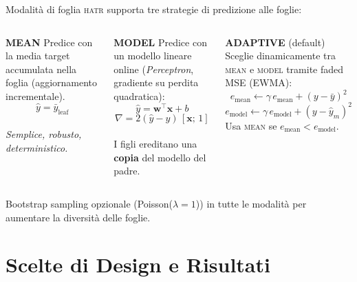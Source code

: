 \documentclass[aspectratio=169,10pt]{beamer}
\newcommand{\hatr}{\textsc{hatr}}
\begin{document}
\begin{frame}{Modalità di foglia}
  \hatr{} supporta tre strategie di predizione alle foglie:

  \bigskip
  \begin{columns}[T]
    \begin{block}{\textbf{MEAN}}
      Predice con la \alert{media target} accumulata nella foglia
      (aggiornamento incrementale).
      \[
        \hat{y} = \bar{y}_{\text{leaf}}
      \]
      \vspace{2pt}\\
      \textit{Semplice, robusto, deterministico.}
    \end{block}

    \begin{block}{\textbf{MODEL}}
      Predice con un \alert{modello lineare online} (\emph{Perceptron},
      gradiente su perdita quadratica):
      \[
        \hat{y} = \mathbf{w}^{\!\top}\!\mathbf{x} + b
      \]
      \[
        \nabla = 2(\hat{y}-y)\,[\mathbf{x};\,1]
      \]
      \vspace{2pt}\\
      I figli ereditano una \textbf{copia} del modello del padre.
    \end{block}

    \begin{block}{\textbf{ADAPTIVE} (default)}
      Sceglie dinamicamente tra \textsc{mean} e \textsc{model} tramite
      \alert{faded MSE} (EWMA):
      \[
        e_{\text{mean}} \leftarrow \gamma\,e_{\text{mean}} + (y-\bar{y})^2
      \]
      \[
        e_{\text{model}} \leftarrow \gamma\,e_{\text{model}} + (y-\hat{y}_m)^2
      \]
      Usa \textsc{mean} se $e_{\text{mean}} < e_{\text{model}}$.
    \end{block}
  \end{columns}

  \bigskip
  \begin{center}
    \small
    Bootstrap sampling opzionale (Poisson($\lambda=1$)) in tutte le
    modalità per aumentare la diversità delle foglie.
  \end{center}
\end{frame}

\section{Scelte di Design e Risultati}
\end{document}
